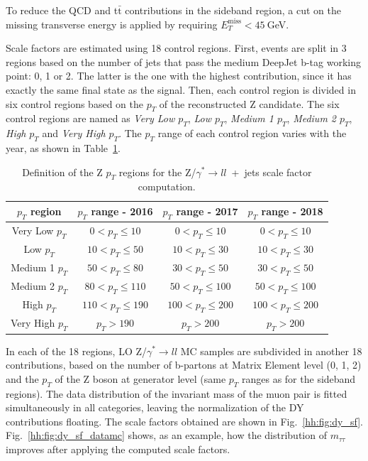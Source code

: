 \documentclass[../main.tex]{subfiles}
\begin{document}
To reduce the QCD and t$\bar{\text{t}}$ contributions in the sideband region, a cut on the missing transverse energy is applied by requiring $E_T^{\text{miss}} < 45~$GeV.

Scale factors are estimated using 18 control regions. First, events are split in 3 regions based on the number of jets that pass the medium DeepJet b-tag working point: 0, 1 or 2. The latter is the one with the highest contribution, since it has exactly the same final state as the signal. Then, each control region is divided in six control regions based on the $p_T$ of the reconstructed Z candidate. The six control regions are named as \textit{Very Low $p_T$}, \textit{Low $p_T$}, \textit{Medium 1 $p_T$}, \textit{Medium 2 $p_T$}, \textit{High $p_T$} and \textit{Very High $p_T$}. The $p_T$ range of each control region varies with the year, as shown in Table~\ref{hh:tab:dy_sf}.

\begin{table}[h!]
\begin{center}
\begin{tabular}{c | c | c | c}
$p_T$ region & $p_T$ range - 2016 & $p_T$ range - 2017 & $p_T$
range - 2018 \\\hline
Very Low $p_T$  & $0<p_T\leq 10$    & $0<p_T\leq 10$    & $0<p_T\leq 10$     \\
Low $p_T$       & $10<p_T\leq 50$   & $10<p_T\leq 30$   & $10<p_T\leq 30$    \\
Medium 1 $p_T$  & $50<p_T\leq 80$   & $30<p_T\leq 50$   & $30<p_T\leq 50$    \\
Medium 2 $p_T$  & $80<p_T\leq 110$  & $50<p_T\leq 100$  & $50<p_T\leq 100$    \\
High $p_T$      & $110<p_T\leq 190$ & $100<p_T\leq 200$ & $100<p_T\leq 200$  \\
Very High $p_T$ & $p_T> 190$        & $p_T> 200$        & $p_T> 200$       
\end{tabular}
\caption{Definition of the Z $p_T$ regions for the Z/$\gamma^*\to ll$~+~jets scale factor computation.}
\label{hh:tab:dy_sf}
\end{center}
\end{table}

In each of the 18 regions, LO Z/$\gamma^*\to ll$ MC samples are subdivided in another 18 contributions, based on the number of b-partons at Matrix Element level (0, 1, 2) and the $p_T$ of the Z boson at generator level (same $p_T$ ranges as for the sideband regions). The data distribution of the invariant mass of the muon pair is fitted simultaneously in all categories, leaving the normalization of the DY contributions floating. The scale factors obtained are shown in Fig.~\ref{hh:fig:dy_sf}. Fig.~\ref{hh:fig:dy_sf_datamc} shows, as an example, how the distribution of $m_{\tau\tau}$ improves after applying the computed scale factors.
\end{document}
